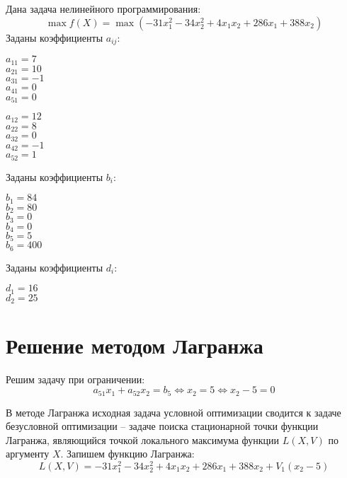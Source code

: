 Дана задача нелинейного программирования:
\begin{equation*}
	\max f(X) = \max \left( -31 x_1^2 - 34 x_2^2 + 4 x_1 x_2 + 286 x_1 + 388 x_2 \right)
\end{equation*}
Заданы коэффициенты $a_{ij}$:
\begin{center}
\begin{multicols}{5}
	$a_{11} = 7$\\
	$a_{21} = 10$\\
	$a_{31} = -1$\\
	$a_{41} = 0$\\
	$a_{51} = 0$\\
\end{multicols}
\begin{multicols}{5}
	$a_{12} = 12$\\
	$a_{22} = 8$\\
	$a_{32} = 0$\\
	$a_{42} = -1$\\
	$a_{52} = 1$\\
\end{multicols}
\end{center}
Заданы коэффициенты $b_i$:
\begin{multicols}{6}
	\centering
	$b_1 = 84$\\
	$b_2 = 80$\\
	$b_3 = 0$\\
	$b_4 = 0$\\
	$b_5 = 5$\\
	$b_6 = 400$\\
\end{multicols}
\noindent Заданы коэффициенты $d_i$:
\begin{multicols}{2}
	\centering
	$d_1 = 16$\\
	$d_2 = 25$\\
\end{multicols}

\section{Решение методом Лагранжа}

Решим задачу при ограничении:
\begin{equation*}
	a_{51} x_1 + a_{52} x_2 = b_5 
\Longleftrightarrow
	x_2 = 5
\Longleftrightarrow
	x_2 - 5 = 0
\end{equation*}

В методе Лагранжа исходная задача условной оптимизации сводится к задаче безусловной оптимизации -- задаче поиска стационарной точки функции Лагранжа, являющийся точкой локального максимума функции $L(X, V)$ по аргументу $X$. Запишем функцию Лагранжа:
\begin{equation*}
	L(X, V) = -31 x_1^2 - 34 x_2^2 + 4 x_1 x_2 + 286 x_1 + 388 x_2 + V_1 \left(x_2 - 5\right)
\end{equation*}

